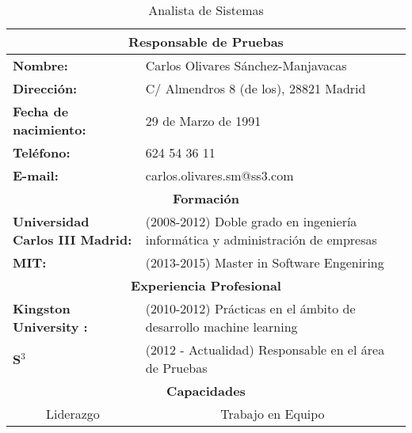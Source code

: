 \begin{table}[!hb]
\begin{center}
\begin{tabular}{p{} p{9cm}}
\multicolumn{2}{c}{\Large{\textbf{Responsable de Pruebas}}} \\
\hline
\textbf{Nombre:} & Carlos Olivares Sánchez-Manjavacas\\
\textbf{Dirección:} & C/ Almendros 8 (de los), 28821 Madrid\\
\textbf{Fecha de nacimiento:} & 29 de Marzo de 1991 \\
\textbf{Teléfono:} & 624 54 36 11\\
\textbf{E-mail:} & carlos.olivares.sm@ss3.com\\
\hline \hline
\multicolumn{2}{c}{\textbf{Formación} } \\
\hline
\textbf{Universidad Carlos III Madrid:} &  (2008-2012) Doble grado en ingeniería informática y administración de empresas  \\
\textbf{MIT:} &  (2013-2015) Master in Software Engeniring   \\
\multicolumn{2}{c}{\textbf{Experiencia Profesional} } \\
\hline
\textbf{Kingston University :} &  (2010-2012) Prácticas en el ámbito de desarrollo machine learning  \\
\textbf{S$^3$} & (2012 - Actualidad) Responsable en el área de Pruebas \\
\hline \hline
\multicolumn{2}{c}{\textbf{Capacidades} } \\
\hline
\multicolumn{1}{c}{Liderazgo} & \multicolumn{1}{c}{Trabajo en Equipo} \\
\hline
\end{tabular}
\caption{Analista de Sistemas}
\label{tab:AnalistadeSistemas}
\end{center}
\end{table}



